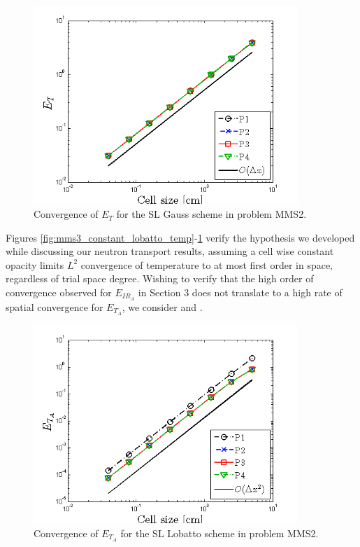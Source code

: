 %
%
\begin{figure}[!hbp]
\centering
\includegraphics[width=10cm]{chapter6_grey_radtran/Dissertation_Data/MMS3_Constant_XS_SL_Gauss_temp_L2.png}
\caption{Convergence of $E_{T}$ for the SL Gauss scheme in problem MMS2.}
\label{fig:mms3_constant_gauss_temp}
\end{figure}
Figures \ref{fig:mms3_constant_lobatto_temp}-\ref{fig:mms3_constant_gauss_temp} verify the hypothesis we developed while discussing our neutron transport results, assuming a cell wise constant opacity limits $L^2$ convergence of temperature to at most first order in space, regardless of trial space degree.
Wishing to verify that the high order of convergence observed for $E_{IR_A}$ in Section 3 does not translate to a high rate of spatial convergence for $E_{T_A}$, we consider  and .
\begin{figure}[!htp]
\centering
\includegraphics[width=10cm]{chapter6_grey_radtran/Dissertation_Data/MMS3_Constant_XS_SL_Lobatto_temp_A.png}
\caption{Convergence of $E_{T_A}$ for the SL Lobatto scheme in problem MMS2.}
\label{fig:mms3_constant_lobatto_temp_A}
\end{figure}

